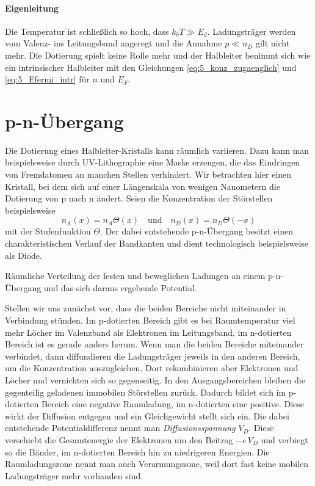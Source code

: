 \paragraph*{Eigenleitung} Die Temperatur ist schließlich so hoch, dass $k_b T \gg E_d$. Ladungsträger werden vom Valenz- ins Leitungsband angeregt und die Annahme $p \ll n_D$ gilt nicht mehr. Die Dotierung spielt keine Rolle mehr und der Halbleiter benimmt sich wie ein intrinsischer Halbleiter mit den Gleichungen  \ref{eq:5_konz_zugaenglich} und  \ref{eq:5_Efermi_intr} für $n$ und $E_F$.


\section{p-n-Übergang}

Die Dotierung eines Halbleiter-Kristalls kann räumlich variieren. Dazu kann man beispielsweise durch UV-Lithographie eine Maske erzeugen, die das Eindringen von Fremdatomen an manchen Stellen verhindert. Wir betrachten hier einen Kristall, bei dem sich auf einer Längenskala von wenigen Nanometern die Dotierung von p nach n ändert.  Seien die Konzentration der Störstellen beispielsweise
\begin{equation}
    n_A(x) = n_A \Theta(x) \quad \text{und}  \quad  n_D(x) = n_D \Theta(-x) 
\end{equation}
mit der Stufenfunktion $\Theta$. Der dabei entstehende p-n-Übergang besitzt einen charakteristischen Verlauf der Bandkanten und dient technologisch beispielsweise als Diode.


\begin{marginfigure}
    \caption{Räumliche Verteilung der festen und beweglichen Ladungen an einem p-n-Übergang und das sich daraus ergebende Potential.}
\end{marginfigure}

Stellen wir uns zunächst vor, dass die beiden Bereiche nicht miteinander in Verbindung stünden. Im p-dotierten Bereich gibt es bei Raumtemperatur viel mehr  Löcher im Valenzband  als Elektronen im Leitungsband, im n-dotierten Bereich ist es gerade anders herum. Wenn man die beiden Bereiche miteinander verbindet, dann diffundieren die Ladungsträger jeweils in den anderen Bereich, um die Konzentration auszugleichen. Dort rekombinieren aber Elektronen und Löcher und vernichten sich so gegenseitig. In den Ausgangsbereichen bleiben die gegenteilig geladenen immobilen Störstellen zurück. Dadurch bildet sich im p-dotierten Bereich eine negative Raumladung, im n-dotierten eine positive. Diese wirkt der Diffusion entgegen und ein Gleichgewicht stellt sich ein. Die dabei entstehende Potentialdifferenz nennt man \emph{Diffusionsspannung} $V_D$. Diese verschiebt die Gesamtenergie der Elektronen um den Beitrag  $-e \, V_D$ und verbiegt so die Bänder, im n-dotierten Bereich hin zu niedrigeren Energien. Die Raumladungszone nennt man auch Verarmungszone, weil dort fast keine mobilen Ladungsträger mehr vorhanden sind. 


